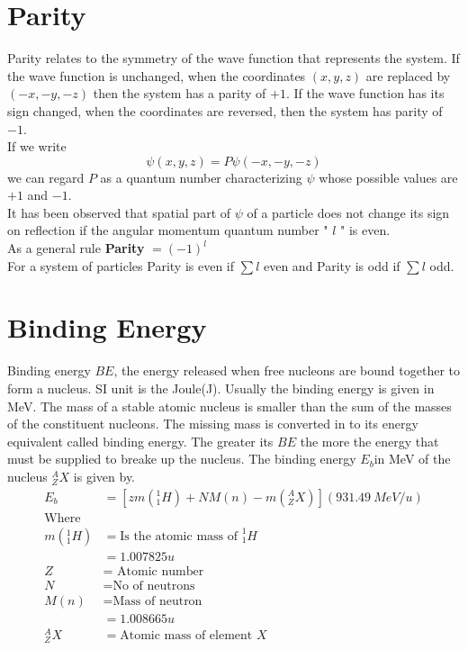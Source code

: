 \section{Parity}
Parity relates to the symmetry of the wave function that represents the system. If the wave function is unchanged, when the coordinates $(x, y, z)$ are replaced by $(-x,-y,-z)$ then the system has a parity of $+1$. If the wave function has its sign changed, when the coordinates are reversed, then the system has parity of $-1$.\\
If we write
$$
\psi(x, y, z)=P \psi(-x,-y,-z)
$$
we can regard $P$ as a quantum number characterizing $\psi$ whose possible values are $+1$ and $-1$.\\
It has been observed that spatial part of $\psi$ of a particle does not change its sign on reflection if the angular momentum quantum number " $l$ " is even.\\
As a general rule \textbf{Parity} $=(-1)^l$\\
For a system of particles Parity is even if $\sum l$ even and Parity is odd if $\sum l$ odd.
\section{Binding Energy}
Binding energy $BE$, the energy released when free nucleons are bound together to form a nucleus. SI unit is the Joule(J). Usually the binding energy is given in MeV. The mass of a stable atomic nucleus is smaller than the sum of the masses of the constituent nucleons. The missing mass is converted in to its energy equivalent called binding energy. The greater its $BE$ the more the energy that must be supplied to breake up the nucleus. The binding energy $E_b$in MeV  of the nucleus $^A_ZX$ is given by.
\begin{align*}
E_b&=\left[ zm(^1_1H)+NM(n)-m(^A_ZX)\right]\left(931.49\  MeV/u \right)  \\
\text{Where}\\
m(^1_1H)&=\text{Is the atomic mass of }^1_1H\\
&=1.007825 u\\
Z&= \text{ Atomic number}\\
N&= \text{No of neutrons}\\
M(n)&=\text{Mass of neutron}\\
&=1.008665 u\\
^A_ZX&= \text{Atomic mass of element }X
\end{align*}
